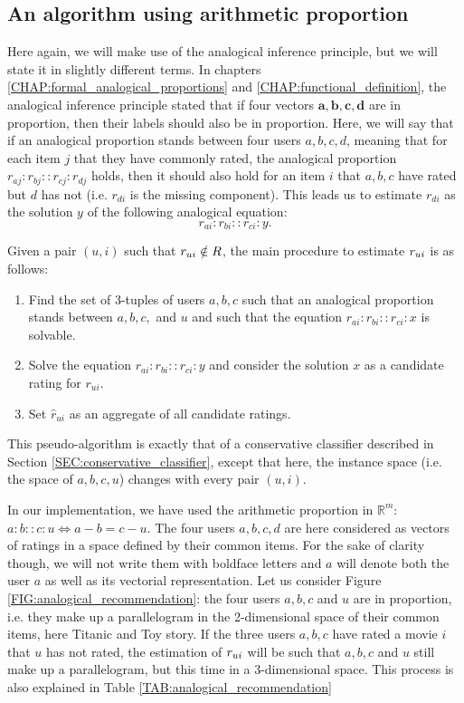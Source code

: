 \subsection{An algorithm using arithmetic proportion}

Here again, we will make use of the analogical inference principle, but we will
state it in slightly different terms. In chapters
\ref{CHAP:formal_analogical_proportions} and \ref{CHAP:functional_definition},
the analogical inference principle stated that if four vectors $\mathbf{a},
\mathbf{b}, \mathbf{c}, \mathbf{d}$ are in proportion, then their labels should
also be in proportion.  Here, we will say that if an analogical proportion
stands between four users $a, b, c, d$, meaning that for each item $j$ that
they have commonly rated, the analogical proportion $r_{aj} : r_{bj} :: r_{cj}
: r_{dj}$ holds, then it should also hold for an item $i$ that $a, b, c$ have
rated but $d$ has not (i.e. $r_{di}$ is the missing component). This leads us
to estimate $r_{di}$ as the solution $y$ of the following analogical
equation: $$r_{ai} : r_{bi} :: r_{ci} : y.$$
\noindent

Given a pair $(u,i)$ such that $r_{ui} \notin R$, the main procedure to
estimate $r_{ui}$ is as follows:
\begin{enumerate}
\item Find the set of 3-tuples of users $a, b, c$ such that an analogical
  proportion stands between $a, b, c,$ and $u$ and such that the equation
    $r_{ai} : r_{bi} :: r_{ci} : x$ is solvable.
\item Solve the equation $r_{ai} : r_{bi} :: r_{ci} : y$ and consider the
  solution $x$ as a candidate rating for $r_{ui}$.
\item Set $\hat{r}_{ui}$ as an aggregate of all candidate ratings.
\end{enumerate}

This pseudo-algorithm is exactly that of a conservative classifier described in
Section \ref{SEC:conservative_classifier}, except that here, the instance space
(i.e. the space of $a, b, c, u$) changes with every pair $(u, i)$.

In our implementation, we have used the arithmetic proportion in
$\mathbb{R}^m$: $a:b::c:u \iff a - b = c - u$.
The four users $a, b, c, d$ are here considered as vectors of ratings in a
space defined by their common items. For the sake of clarity though, we will
not write them with boldface letters and $a$ will denote both the user $a$ as
well as its vectorial representation. Let us consider
Figure \ref{FIG:analogical_recommendation}: the four users $a, b, c$ and $u$
are in proportion, i.e. they make up a parallelogram in the 2-dimensional space of their
common items, here Titanic and Toy story. If the three users $a, b, c$ have
rated a movie $i$ that $u$ has not rated, the estimation of $r_{ui}$ will be such
that $a, b, c$ and $u$ still make up a parallelogram, but this time in a
3-dimensional space. This process is also explained in Table
\ref{TAB:analogical_recommendation}

